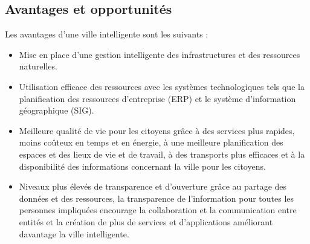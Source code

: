 \documentclass[french, a4paper, 12pt]{report}
\begin{document}
\subsection{Avantages et opportunités}
Les avantages d’une ville intelligente sont les suivants :
\begin{itemize}
\item \textbf{}Mise en place d’une gestion intelligente des infrastructures et des ressources naturelles.
\item \textbf{}Utilisation efficace des ressources avec les systèmes technologiques tels que la planification des ressources d'entreprise (ERP) et le système d'information géographique (SIG).
\item \textbf{}Meilleure qualité de vie pour les citoyens grâce à des services plus rapides, moins coûteux en temps et en énergie, à une meilleure planification des espaces et des lieux de vie et de travail, à des transports plus efficaces et à la disponibilité des informations concernant la ville pour les citoyens. 
\item \textbf{}Niveaux plus élevés de transparence et d’ouverture grâce au partage des données et des ressources, la transparence de l'information pour toutes les personnes impliquées encourage la collaboration et la communication entre entités et la création de plus de services et d'applications améliorant davantage la ville intelligente.
\end{itemize}
\end{document}
